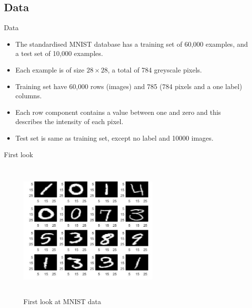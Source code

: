 \documentclass{beamer}
\theoremstyle{plain}
\theoremstyle{definition}
\theoremstyle{plain}
\theoremstyle{plain}
\begin{document}
\subsection{Data}
\begin{frame}{Data}
\begin{itemize}
\item The standardised MNIST database has a training set of 60,000 examples, and a test set of 10,000 examples.
\item Each example is of size $28\times28$, a total of 784 greyscale pixels.
\item Training set have 60,000 rows (images) and 785 (784 pixels and a one label) columns. 
\item Each row component contains a value between one and zero and this describes the intensity of each pixel.
\item Test set is same as training set, except no label and 10000 images.
\end{itemize}
\end{frame}
\begin{frame}{First look}
\begin{figure}[h!]
\begin{center}
\includegraphics[width= 7cm, height =7cm]{./figures/O.png}
\caption {First look at MNIST data}
\label{4_1} 
\end{center}
\end{figure}
\end{frame}
\end{document}

